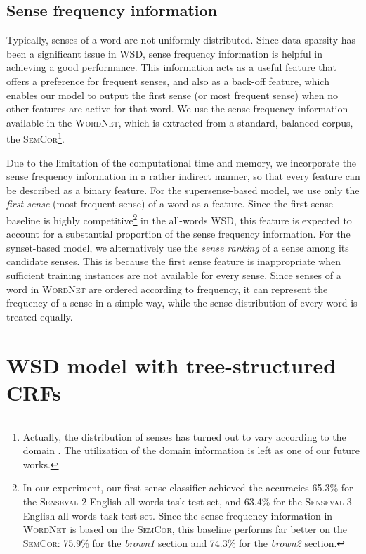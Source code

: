 \documentclass[english]{jnlp_1.4}
\begin{document}
\subsection{Sense frequency information}
\label{section:first-sense}

Typically, senses of a word are not uniformly distributed.
Since data sparsity has been a significant issue in WSD, sense frequency information is helpful in achieving a good performance.
This information acts as a useful feature that offers a preference for frequent senses, and also as a back-off feature, which enables our model to output the first sense (or most frequent sense) when no other features are active for that word.
We use the sense frequency information available in the \textsc{WordNet}, which is extracted from a standard, balanced corpus, the \textsc{SemCor}\footnote{Actually, the distribution of senses has turned out to vary according to the domain \cite{mccarthy:2004}. The utilization of the domain information is left as one of our future works.}.


Due to the limitation of the computational time and memory, we incorporate the sense frequency information in a rather indirect manner, so that every feature can be described as a binary feature.
For the supersense-based model, we use only the \textit{first sense} (most frequent sense) of a word as a feature.
Since the first sense baseline is highly competitive\footnote{In our experiment, our first sense classifier achieved the accuracies 65.3\% for the \textsc{Senseval}-2 English all-words task test set, and 63.4\% for the \textsc{Senseval}-3 English all-words task test set. Since the sense frequency information in \textsc{WordNet} is based on the \textsc{SemCor}, this baseline performs far better on the \textsc{SemCor}: 75.9\% for the \textit{brown1} section and 74.3\% for the \textit{brown2} section.} in the all-words WSD, this feature is expected to account for a substantial proportion of the sense frequency information.
For the synset-based model, we alternatively use the \textit{sense ranking} of a sense among its candidate senses.
This is because the first sense feature is inappropriate when sufficient training instances are not available for every sense.
Since senses of a word in \textsc{WordNet} are ordered according to frequency, it can represent the frequency of a sense in a simple way, while the sense distribution of every word is treated equally.


\section{WSD model with tree-structured CRFs}
\label{section:model}
\end{document}
